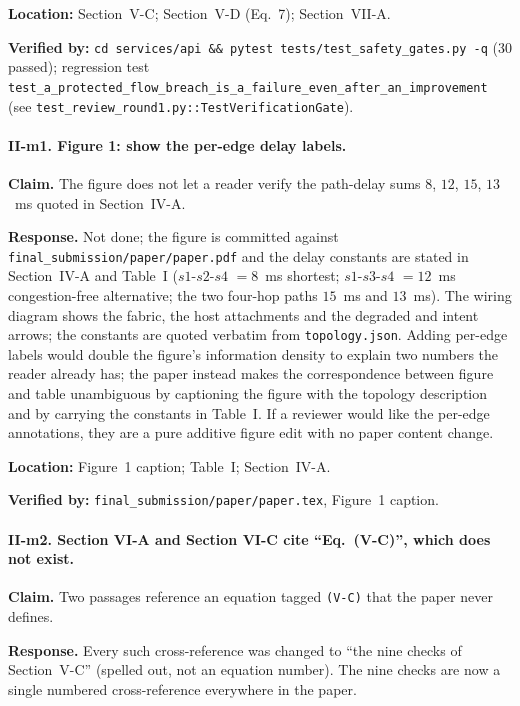 \documentclass[11pt,a4paper]{article}
\begin{document}
\textbf{Location:} Section~V-C; Section~V-D (Eq.~7); Section~VII-A.

\textbf{Verified by:}
\texttt{cd services/api \&\& pytest tests/test\_safety\_gates.py -q}
(30 passed); regression test
\texttt{test\_a\_protected\_flow\_breach\_is\_a\_failure\_even\_after\_an\_improvement}
(see \texttt{test\_review\_round1.py::TestVerificationGate}).

\paragraph{II-m1. Figure 1: show the per-edge delay labels.}

\textbf{Claim.} The figure does not let a reader verify the path-delay sums
$8$, $12$, $15$, $13$~ms quoted in Section~IV-A.

\textbf{Response.} Not done; the figure is committed against
\texttt{final\_submission/paper/paper.pdf} and the delay constants are stated
in Section~IV-A and Table~I ($s1$-$s2$-$s4$ $= 8$~ms shortest;
$s1$-$s3$-$s4$ $= 12$~ms congestion-free alternative; the two four-hop paths
$15$~ms and $13$~ms). The wiring diagram shows the fabric, the host
attachments and the degraded and intent arrows; the constants are quoted
verbatim from \texttt{topology.json}. Adding per-edge labels would
double the figure's information density to explain two numbers the reader
already has; the paper instead makes the correspondence between figure and
table unambiguous by captioning the figure with the topology description and
by carrying the constants in Table~I. If a reviewer would like the per-edge
annotations, they are a pure additive figure edit with no paper content
change.

\textbf{Location:} Figure~1 caption; Table~I; Section~IV-A.

\textbf{Verified by:} \texttt{final\_submission/paper/paper.tex}, Figure~1 caption.

\paragraph{II-m2. Section VI-A and Section VI-C cite ``Eq.~(V-C)'', which does
not exist.}

\textbf{Claim.} Two passages reference an equation tagged \texttt{(V-C)} that
the paper never defines.

\textbf{Response.} Every such cross-reference was changed to ``the nine
checks of Section~V-C'' (spelled out, not an equation number). The nine
checks are now a single numbered cross-reference everywhere in the paper.
\end{document}
